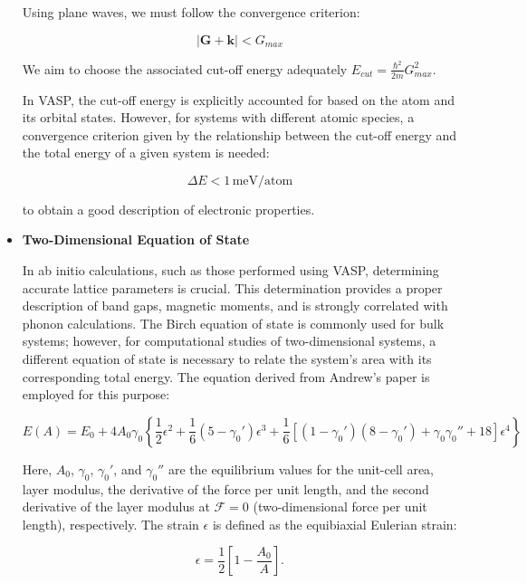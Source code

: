 \begin{itemize}
Using plane waves, we must follow the convergence criterion:

\begin{equation}
	|\mathbf{G} + \mathbf{k}| < G_{max}
\end{equation}

We aim to choose the associated cut-off energy adequately \(E_{cut} = \frac{\hbar^2}{2m} G_{max}^2\).

In VASP, the cut-off energy is explicitly accounted for based on the atom and its orbital states. However, for systems with different atomic species, a convergence criterion given by the relationship between the cut-off energy and the total energy of a given system is needed:

\begin{equation}
	\Delta E < 1 \, \text{meV/atom}
\end{equation}

to obtain a good description of electronic properties.




\item \textbf{Two-Dimensional Equation of State} \label{2D.eqs}

In ab initio calculations, such as those performed using VASP, determining accurate lattice parameters is crucial. This determination provides a proper description of band gaps, magnetic moments, and is strongly correlated with phonon calculations. The Birch equation of state is commonly used for bulk systems; however, for computational studies of two-dimensional systems, a different equation of state is necessary to relate the system's area with its corresponding total energy. The equation derived from Andrew's paper \supercite{andrew2012} is employed for this purpose:

\begin{equation}  
	E(A) = E_0 + 4 A_0 \gamma_0 \left\{ \frac{1}{2} \epsilon^2 + \frac{1}{6} (5 - \gamma_0') \epsilon^3  + \frac{1}{6}\left[ (1 - \gamma_0') (8 - \gamma_0')+ \gamma_0 \gamma_0''+18 \right] \epsilon^4 \right\}  
\end{equation}  

Here, $A_0$, $\gamma_0$, $\gamma_0'$, and $\gamma_0''$ are the equilibrium values for the unit-cell area, layer modulus, the derivative of the force per unit length, and the second derivative of the layer modulus at $\mathcal{F}=0$ (two-dimensional force per unit length), respectively. The strain $\epsilon$ is defined as the equibiaxial Eulerian strain:

\begin{equation}  
	\epsilon = \frac{1}{2} \left[ 1 - \frac{A_0}{A} \right].  
\end{equation}  


\end{itemize}
